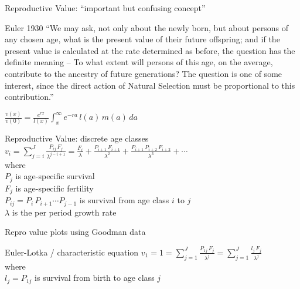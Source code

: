 \documentclass{beamer}
\begin{document}
\begin{frame}{Reproductive Value: ``important but confusing concept''}
\begin{block}{Euler 1930}
``We may ask, not only about the newly born, but about persons of any chosen age, what is the present value of their future offspring; and if the present value is calculated at the rate determined as before, the question has the definite meaning -- To what extent will persons of this age, on the average, contribute to the ancestry of future generations? The question is one of some interest, since the direct action of Natural Selection must be proportional to this contribution.''
\end{block}
\vspace{.5cm}
\pause
$\frac{v(x)}{v(0)} = \frac{e^{rx}}{l(x)} \int_{x}^{\infty} e^{-ra} \, l(a) \, m(a) \, da$
\end{frame}

\begin{frame}{Reproductive Value: discrete age classes}
  $v_i =  \displaystyle\sum\limits_{j=i}^{J} \frac{P_{ij} \, F_j}{\lambda^{j-i+1}} = \frac{F_i}{\lambda} + \frac{P_{i+1} \, F_{i+1}}{\lambda^2} + \frac{P_{i+1} \, P_{i+2} \, F_{i+2}}{\lambda^3} + \cdots$\\
  \vspace{.5cm}
  where\\
  \vspace{.5cm}
  $P_j$ is age-specific survival\\
  \vspace{.5cm}
  $F_j$ is age-specific fertility\\
  \vspace{.5cm}
  $P_{ij} = P_i \, P_{i+1} \cdots P_{j-1}$ is survival from age class $i$ to $j$\\
  \vspace{.5cm}
  $\lambda$ is the per period growth rate\\
\end{frame}

\begin{frame}{Repro value plots using Goodman data}
\end{frame}

\begin{frame}{Euler-Lotka / characteristic equation}
  $v_1 = 1 = \displaystyle\sum\limits_{j=1}^{J} \frac{P_{1j} \, F_j}{\lambda^j} = \displaystyle\sum\limits_{j=1}^{J} \frac{l_j \, F_j}{\lambda^j}$\\
\vspace{.5cm}
where\\
\vspace{.5cm}
  $l_j = P_{1j}$ is survival from birth to age class $j$\\
\end{frame}
\end{document}
